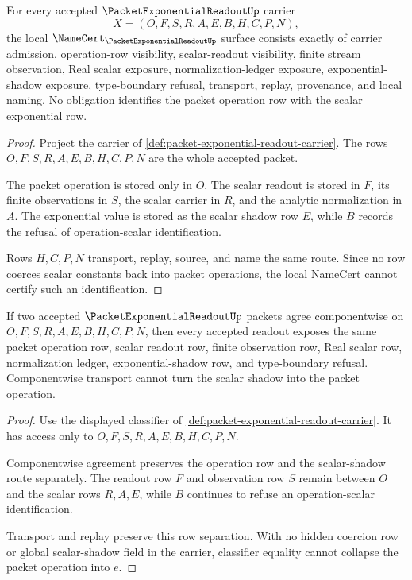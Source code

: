 \begin{theorem}
\label{thm:packet-exponential-readout-namecert-obligations}
For every accepted $\PacketExponentialReadoutUp$ carrier
$$
X=(O,F,S,R,A,E,B,H,C,P,N),
$$
the local $\NameCert_{\PacketExponentialReadoutUp}$ surface consists exactly of carrier admission, operation-row visibility, scalar-readout visibility, finite stream observation, Real scalar exposure, normalization-ledger exposure, exponential-shadow exposure, type-boundary refusal, transport, replay, provenance, and local naming. No obligation identifies the packet operation row with the scalar exponential row.
\end{theorem}
\begin{proof}
Project the carrier of \autoref{def:packet-exponential-readout-carrier}. The rows $O,F,S,R,A,E,B,H,C,P,N$ are the whole accepted packet.

The packet operation is stored only in $O$. The scalar readout is stored in $F$, its finite observations in $S$, the scalar carrier in $R$, and the analytic normalization in $A$. The exponential value is stored as the scalar shadow row $E$, while $B$ records the refusal of operation-scalar identification.

Rows $H,C,P,N$ transport, replay, source, and name the same route. Since no row coerces scalar constants back into packet operations, the local NameCert cannot certify such an identification.
\end{proof}

\begin{theorem}
\label{thm:packet-exponential-readout-classifier-stability}
If two accepted $\PacketExponentialReadoutUp$ packets agree componentwise on $O,F,S,R,A,E,B,H,C,P,N$, then every accepted readout exposes the same packet operation row, scalar readout row, finite observation row, Real scalar row, normalization ledger, exponential-shadow row, and type-boundary refusal. Componentwise transport cannot turn the scalar shadow into the packet operation.
\end{theorem}
\begin{proof}
Use the displayed classifier of \autoref{def:packet-exponential-readout-carrier}. It has access only to $O,F,S,R,A,E,B,H,C,P,N$.

Componentwise agreement preserves the operation row and the scalar-shadow route separately. The readout row $F$ and observation row $S$ remain between $O$ and the scalar rows $R,A,E$, while $B$ continues to refuse an operation-scalar identification.

Transport and replay preserve this row separation. With no hidden coercion row or global scalar-shadow field in the carrier, classifier equality cannot collapse the packet operation into $e$.
\end{proof}

